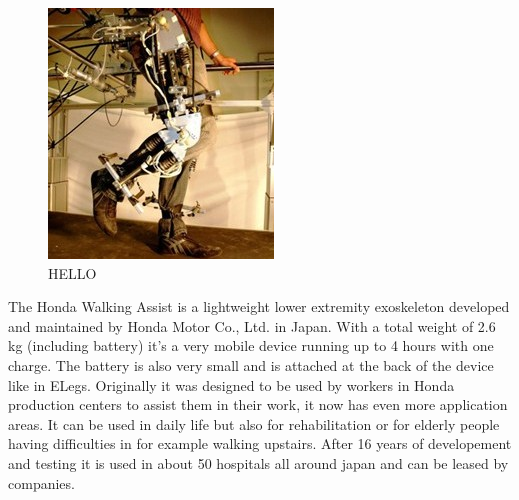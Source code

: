 \documentclass[letterpaper, 10 pt, conference]{ieeeconf}  %
\begin{document}

\begin{figure}[H]
  \centering
    \includegraphics[scale=1]{img/lopes}
  \caption{HELLO}
\end{figure}


The Honda Walking Assist is a lightweight lower extremity exoskeleton developed and maintained by Honda Motor Co., Ltd. in Japan. With a total weight of 2.6 kg (including battery) it's a very mobile device running up to 4 hours with one charge. The battery is also very small and is attached at the back of the device like in ELegs. Originally it was designed to be used by workers in Honda production centers to assist them in their work, it now has even more application areas. It can be used in daily life but also for rehabilitation or for elderly people having difficulties in for example walking upstairs. After 16 years of developement and testing it is used in about 50 hospitals all around japan and can be leased by companies.

\end{document}
